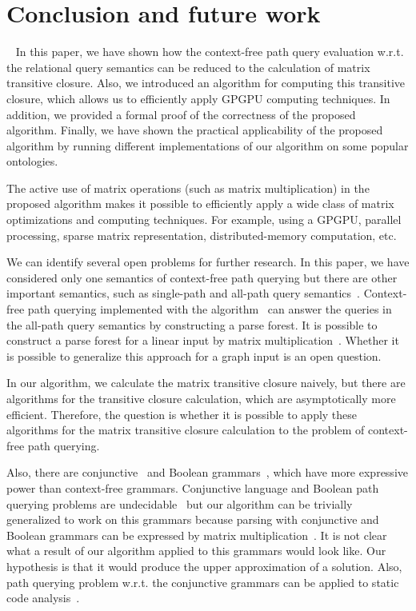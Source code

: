 \section{Conclusion and future work} ~\label{section_conclusion}
In this paper, we have shown how the context-free path query evaluation w.r.t. the relational query semantics can be reduced to the calculation of matrix transitive closure. Also, we introduced an algorithm for computing this transitive closure, which allows us to efficiently apply GPGPU computing techniques. In addition, we provided a formal proof of the correctness of the proposed algorithm. Finally, we have shown the practical applicability of the proposed algorithm by running different implementations of our algorithm on some popular ontologies.

The active use of matrix operations (such as matrix multiplication) in the proposed algorithm makes it possible to efficiently apply a wide class of matrix optimizations and computing techniques. For example, using a GPGPU, parallel processing, sparse matrix representation, distributed-memory computation, etc.

We can identify several open problems for further research. In this paper, we have considered only one semantics of context-free path querying but there are other important semantics, such as single-path and all-path query semantics~\cite{hellingsPathQuerying}. Context-free path querying implemented with the algorithm~\cite{GLL} can answer the queries in the all-path query semantics by constructing a parse forest. It is possible to construct a parse forest for a linear input by matrix multiplication~\cite{okhotin_cyk}. Whether it is possible to generalize this approach for a graph input is an open question.

In our algorithm, we calculate the matrix transitive closure naively, but there are algorithms for the transitive closure calculation, which are asymptotically more efficient. Therefore, the question is whether it is possible to apply these algorithms for the matrix transitive closure calculation to the problem of context-free path querying.

Also, there are conjunctive~\cite{okhotinConjAndBool} and Boolean grammars~\cite{okhotinBoolean}, which have more expressive power than context-free grammars. Conjunctive language and Boolean path querying problems are undecidable~\cite{hellingsRelational} but our algorithm can be trivially generalized to work on this grammars because parsing with conjunctive and Boolean grammars can be expressed by matrix multiplication~\cite{okhotin_cyk}. It is not clear what a result of our algorithm applied to this grammars would look like. Our hypothesis is that it would produce the upper approximation of a solution. Also, path querying problem w.r.t. the conjunctive grammars can be applied to static code analysis~\cite{zhang2017context}.
